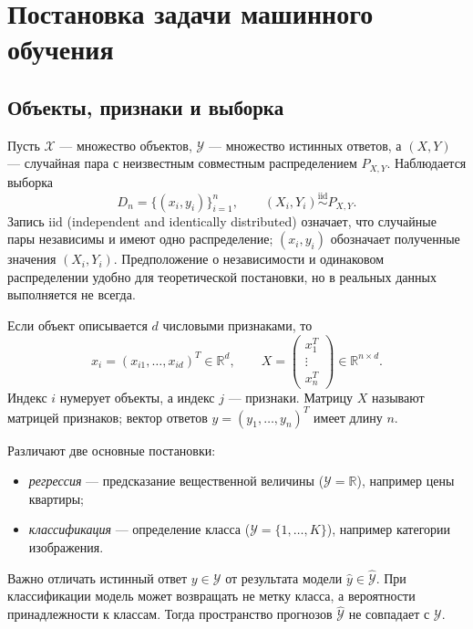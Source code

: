\documentclass[12pt,a4paper]{article}
\newcommand{\R}{\mathbb{R}}
\begin{document}
\section{Постановка задачи машинного обучения}

\subsection{Объекты, признаки и выборка}

Пусть $\mathcal X$ --- множество объектов, $\mathcal Y$ --- множество
истинных ответов, а $(X,Y)$ --- случайная пара с неизвестным совместным
распределением $P_{X,Y}$. Наблюдается выборка
\begin{equation}
    D_n=\{(x_i,y_i)\}_{i=1}^{n},
    \qquad (X_i,Y_i)\overset{\mathrm{iid}}{\sim}P_{X,Y}.
    \label{eq:sample}
\end{equation}
Запись $\mathrm{iid}$ (independent and identically distributed) означает,
что случайные пары независимы и имеют одно распределение;
$(x_i,y_i)$ обозначает полученные значения $(X_i,Y_i)$.
Предположение о независимости и одинаковом распределении удобно для
теоретической постановки, но в реальных данных выполняется не всегда.

Если объект описывается $d$ числовыми признаками, то
\[
    x_i=(x_{i1},\ldots,x_{id})^T\in\R^d,
    \qquad
    X=\begin{pmatrix}x_1^T\\ \vdots\\ x_n^T\end{pmatrix}\in\R^{n\times d}.
\]
Индекс $i$ нумерует объекты, а индекс $j$ --- признаки.
Матрицу $X$ называют матрицей признаков; вектор ответов
$y=(y_1,\ldots,y_n)^T$ имеет длину $n$.

Различают две основные постановки:
\begin{itemize}
    \item \emph{регрессия} --- предсказание вещественной величины
    ($\mathcal Y=\R$), например цены квартиры;
    \item \emph{классификация} --- определение класса
    ($\mathcal Y=\{1,\ldots,K\}$), например категории изображения.
\end{itemize}
Важно отличать истинный ответ $y\in\mathcal Y$ от результата модели
$\hat y\in\widehat{\mathcal Y}$. При классификации модель может возвращать
не метку класса, а вероятности принадлежности к классам. Тогда пространство
прогнозов $\widehat{\mathcal Y}$ не совпадает с $\mathcal Y$.
\end{document}
